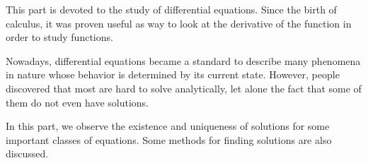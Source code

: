\label{part:diffeq}

This part is devoted to the study of differential equations.
Since the birth of calculus,
it was proven useful as way to look at the derivative of the function
in order to study functions.

Nowadays, differential equations became a standard
to describe many phenomena in nature
whose behavior is determined by its current state.
However, people discovered that most are hard to solve analytically,
let alone the fact that some of them do not even have solutions.

In this part,
we observe the existence and uniqueness of solutions
for some important classes of equations.
Some methods for finding solutions are also discussed.